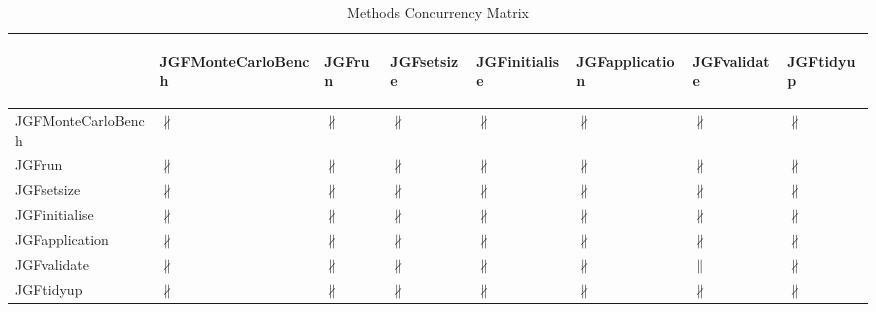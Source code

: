 \documentclass[10pt]{article}
\begin{document}
\begin{longtable}{|l|l|l|l|l|l|l|l|}
\caption{Methods Concurrency Matrix}\\
\hline
&\begin{sideways}JGFMonteCarloBench\end{sideways}&\begin{sideways}JGFrun\end{sideways}&\begin{sideways}JGFsetsize\end{sideways}&\begin{sideways}JGFinitialise\end{sideways}&\begin{sideways}JGFapplication\end{sideways}&\begin{sideways}JGFvalidate\end{sideways}&\begin{sideways}JGFtidyup\end{sideways}\\
\hline
JGFMonteCarloBench&{\color{BrickRed}$\nparallel$}&{\color{BrickRed}$\nparallel$}&{\color{BrickRed}$\nparallel$}&{\color{BrickRed}$\nparallel$}&{\color{BrickRed}$\nparallel$}&{\color{BrickRed}$\nparallel$}&{\color{BrickRed}$\nparallel$}\\
\hline
JGFrun&{\color{BrickRed}$\nparallel$}&{\color{BrickRed}$\nparallel$}&{\color{BrickRed}$\nparallel$}&{\color{BrickRed}$\nparallel$}&{\color{BrickRed}$\nparallel$}&{\color{BrickRed}$\nparallel$}&{\color{BrickRed}$\nparallel$}\\
\hline
JGFsetsize&{\color{BrickRed}$\nparallel$}&{\color{BrickRed}$\nparallel$}&{\color{BrickRed}$\nparallel$}&{\color{BrickRed}$\nparallel$}&{\color{BrickRed}$\nparallel$}&{\color{BrickRed}$\nparallel$}&{\color{BrickRed}$\nparallel$}\\
\hline
JGFinitialise&{\color{BrickRed}$\nparallel$}&{\color{BrickRed}$\nparallel$}&{\color{BrickRed}$\nparallel$}&{\color{BrickRed}$\nparallel$}&{\color{BrickRed}$\nparallel$}&{\color{BrickRed}$\nparallel$}&{\color{BrickRed}$\nparallel$}\\
\hline
JGFapplication&{\color{BrickRed}$\nparallel$}&{\color{BrickRed}$\nparallel$}&{\color{BrickRed}$\nparallel$}&{\color{BrickRed}$\nparallel$}&{\color{BrickRed}$\nparallel$}&{\color{BrickRed}$\nparallel$}&{\color{BrickRed}$\nparallel$}\\
\hline
JGFvalidate&{\color{BrickRed}$\nparallel$}&{\color{BrickRed}$\nparallel$}&{\color{BrickRed}$\nparallel$}&{\color{BrickRed}$\nparallel$}&{\color{BrickRed}$\nparallel$}&{\color{blue}$\parallel$}&{\color{BrickRed}$\nparallel$}\\
\hline
JGFtidyup&{\color{BrickRed}$\nparallel$}&{\color{BrickRed}$\nparallel$}&{\color{BrickRed}$\nparallel$}&{\color{BrickRed}$\nparallel$}&{\color{BrickRed}$\nparallel$}&{\color{BrickRed}$\nparallel$}&{\color{BrickRed}$\nparallel$}\\
\hline
\end{longtable}
\newpage
\end{document}
